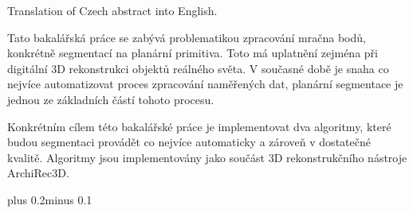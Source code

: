 \documentclass[11pt,twoside,a4paper]{book}
\begin{document}
Translation of Czech abstract into English.


\baselineskip

\noindent
Tato bakalářská práce se zabývá problematikou zpracování mračna bodů, konkrétně segmentací na planární
primitiva. Toto má uplatnění zejména při digitální 3D rekonstrukci objektů reálného světa. V současné době je
snaha co nejvíce automatizovat proces zpracování naměřených dat, planární segmentace je jednou ze základních
částí tohoto procesu.

Konkrétním cílem této bakalářské práce je implementovat dva algoritmy, které budou segmentaci provádět co
nejvíce automaticky a zároveň v dostatečné kvalitě. Algoritmy jsou implementovány jako součást 3D
rekonstrukčního nástroje ArchiRec3D.

\tableofcontents

\listoffigures

\listoftables


\mainbodystarts
\normalfont
{}\baselineskip plus 0.2\baselineskip minus 0.1\baselineskip



% 
% 
\end{document}
